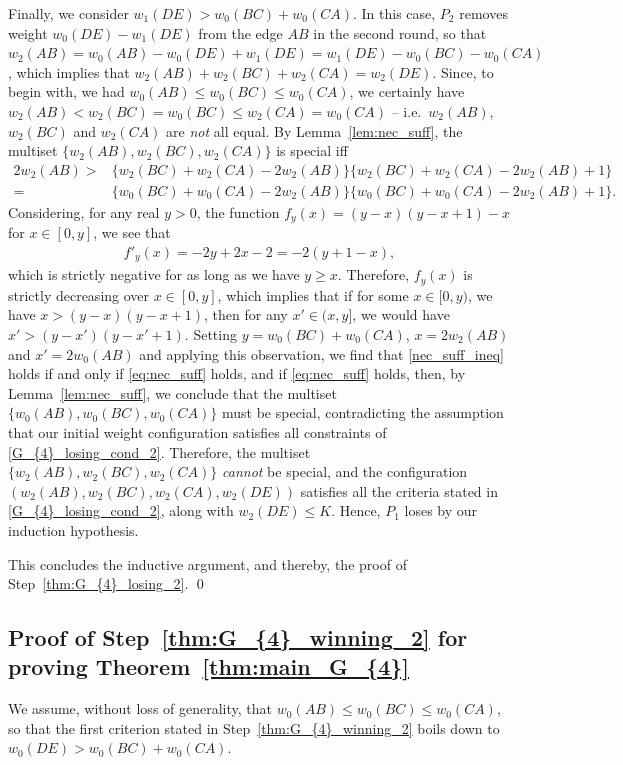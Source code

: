 \documentclass[11pt,reqno]{amsart}
\theoremstyle{definition}
\theoremstyle{definition}
\begin{document}
\begin{enumerate}
Finally, we consider $w_{1}(DE)>w_{0}(BC)+w_{0}(CA)$. In this case, $P_{2}$ removes weight $w_{0}(DE)-w_{1}(DE)$ from the edge $AB$ in the second round, so that $w_{2}(AB)=w_{0}(AB)-w_{0}(DE)+w_{1}(DE)=w_{1}(DE)-w_{0}(BC)-w_{0}(CA)$, which implies that $w_{2}(AB)+w_{2}(BC)+w_{2}(CA)=w_{2}(DE)$. Since, to begin with, we had $w_{0}(AB)\leqslant w_{0}(BC)\leqslant w_{0}(CA)$, we certainly have $w_{2}(AB)<w_{2}(BC)=w_{0}(BC)\leqslant w_{2}(CA)=w_{0}(CA)$ -- i.e.\ $w_{2}(AB)$, $w_{2}(BC)$ and $w_{2}(CA)$ are \emph{not} all equal. By Lemma~\ref{lem:nec_suff}, the multiset $\{w_{2}(AB),w_{2}(BC),w_{2}(CA)\}$ is special iff
\begin{align}
2w_{2}(AB)>{}&\{w_{2}(BC)+w_{2}(CA)-2w_{2}(AB)\}\{w_{2}(BC)+w_{2}(CA)-2w_{2}(AB)+1\}\nonumber\\
={}&\{w_{0}(BC)+w_{0}(CA)-2w_{2}(AB)\}\{w_{0}(BC)+w_{0}(CA)-2w_{2}(AB)+1\}.\label{nec_suff_ineq}
\end{align}
Considering, for any real $y>0$, the function $f_{y}(x)=(y-x)(y-x+1)-x$ for $x \in [0,y]$, we see that 
\begin{align}
f'_{y}(x)=-2y+2x-2=-2(y+1-x),\nonumber
\end{align}
which is strictly negative for as long as we have $y \geqslant x$. Therefore, $f_{y}(x)$ is strictly decreasing over $x \in [0,y]$, which implies that if for some $x \in [0,y)$, we have $x>(y-x)(y-x+1)$, then for any $x' \in (x,y]$, we would have $x'>(y-x')(y-x'+1)$. Setting $y=w_{0}(BC)+w_{0}(CA)$, $x=2w_{2}(AB)$ and $x'=2w_{0}(AB)$ and applying this observation, we find that \eqref{nec_suff_ineq} holds if and only if \eqref{eq:nec_suff} holds, and if \eqref{eq:nec_suff} holds, then, by Lemma~\ref{lem:nec_suff}, we conclude that the multiset $\{w_{0}(AB),w_{0}(BC),w_{0}(CA)\}$ must be special, contradicting the assumption that our initial weight configuration satisfies all constraints of \eqref{G_{4}_losing_cond_2}. Therefore, the multiset $\{w_{2}(AB),w_{2}(BC),w_{2}(CA)\}$ \emph{cannot} be special, and the configuration $(w_{2}(AB),w_{2}(BC),w_{2}(CA),w_{2}(DE))$ satisfies all the criteria stated in \eqref{G_{4}_losing_cond_2}, along with $w_{2}(DE)\leqslant K$. Hence, $P_{1}$ loses by our induction hypothesis.
\end{enumerate}
This concludes the inductive argument, and thereby, the proof of Step~\eqref{thm:G_{4}_losing_2}. \qed

\subsection{Proof of Step~\eqref{thm:G_{4}_winning_2} for proving Theorem~\ref{thm:main_G_{4}}}
\sloppy We assume, without loss of generality, that $w_{0}(AB)\leqslant w_{0}(BC) \leqslant w_{0}(CA)$, so that the first criterion stated in Step~\eqref{thm:G_{4}_winning_2} boils down to $w_{0}(DE) > w_{0}(BC)+w_{0}(CA)$. 
\end{document}
